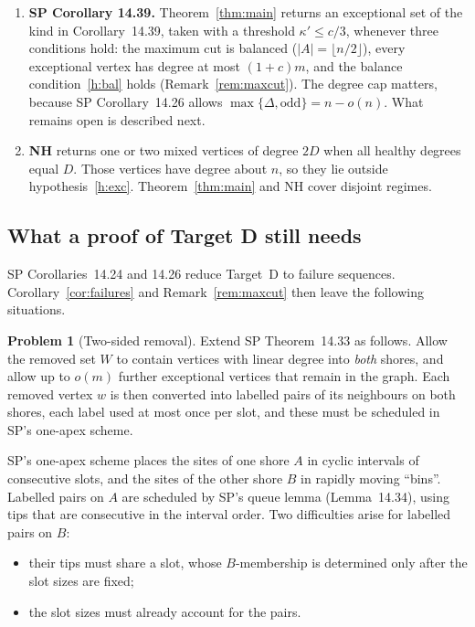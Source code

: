 \documentclass[11pt]{article}
\theoremstyle{definition}
\newtheorem{problem}[theorem]{Problem}
\newcommand{\odd}{\mathrm{odd}}
\begin{document}
\begin{enumerate}[label=(\arabic*)]
\item \textbf{SP Corollary 14.39.} Theorem~\ref{thm:main} returns an exceptional set of the kind in Corollary~14.39, taken with a threshold $\kappa'\le c/3$, whenever three conditions hold: the maximum cut is balanced ($|A|=\lfloor n/2\rfloor$), every exceptional vertex has degree at most $(1+c)m$, and the balance condition~\ref{h:bal} holds (Remark~\ref{rem:maxcut}). The degree cap matters, because SP Corollary~14.26 allows $\max\{\Delta,\odd\}=n-o(n)$. What remains open is described next.
\item \textbf{NH} returns one or two mixed vertices of degree $2D$ when all healthy degrees equal $D$. Those vertices have degree about $n$, so they lie outside hypothesis~\ref{h:exc}. Theorem~\ref{thm:main} and NH cover disjoint regimes.
\end{enumerate}

\subsection{What a proof of Target D still needs}
SP Corollaries~14.24 and 14.26 reduce Target~D to failure sequences. Corollary~\ref{cor:failures} and Remark~\ref{rem:maxcut} then leave the following situations.

\begin{problem}[Two-sided removal]\label{prob:twosided}
Extend SP Theorem~14.33 as follows. Allow the removed set $W$ to contain vertices with linear degree into \emph{both} shores, and allow up to $o(m)$ further exceptional vertices that remain in the graph. Each removed vertex $w$ is then converted into labelled pairs of its neighbours on both shores, each label used at most once per slot, and these must be scheduled in SP's one-apex scheme.
\end{problem}

SP's one-apex scheme places the sites of one shore $A$ in cyclic intervals of consecutive slots, and the sites of the other shore $B$ in rapidly moving ``bins''. Labelled pairs on $A$ are scheduled by SP's queue lemma (Lemma~14.34), using tips that are consecutive in the interval order. Two difficulties arise for labelled pairs on $B$:
\begin{itemize}[nosep]
\item their tips must share a slot, whose $B$-membership is determined only after the slot sizes are fixed;
\item the slot sizes must already account for the pairs.
\end{itemize}
\end{document}
